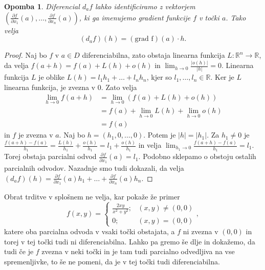 \documentclass[10pt, a4paper]{article}
\newtheorem*{opomba}{Opomba}
\newenvironment{noticeC}{%
  \tcolorbox[%
  notitle,
  empty,
  enhanced,  %
  breakable,
  coltext=black, 
  fontupper=\rmfamily,
  parbox=false,
  noparskip,
  sharp corners,
  boxrule=-1pt,  %
  frame hidden,
  left=7pt,  %
  right=7pt,
  top=5pt,
  bottom=5pt,
  before skip=2.5ex plus 2pt,
  after skip=2.5ex plus 2pt,
  overlay unbroken and last={%
  },
  ]}
{\endtcolorbox}
\newenvironment{dokaz}%
  {\begin{noticeC}\begin{proof}}%
  {\end{proof}\end{noticeC}}
\newcommand{\R}{\mathbb {R}}
\begin{document}
\begin{opomba}
    Diferencial $d_a f$ lahko identificiramo z vektorjem $(\frac{\partial f}{\partial x_1} (a), \dots, \frac{\partial f}{\partial x_n} (a))$,
    ki ga imenujemo gradient funkcije $f$ v točki $a$. Tako velja 
    $$(d_a f) (h) = (\mathrm{\text{grad \(f\)}}) (a) \cdot h.$$
\end{opomba}

\begin{dokaz}
    Naj bo $f$ v $a \in D$ diferenciabilna, zato obstaja linearna funkcija $L: \R^n \rightarrow \R$,
    da velja $f(a + h) = f(a) + L(h) + o(h)$ in $\lim_{h \to 0} \frac{|o (h)|}{|h|} = 0$.
    Linearna funkcija $L$ je oblike $L(h) = l_1 h_1 + \dots + l_n h_n$, 
    kjer so $l_1, \dots, l_n \in \R$. Ker je $L$ linearna funkcija, je zvezna v $0$.
    Zato velja 
    \begin{align*}
        \lim_{h \to 0} f(a + h) &= \lim_{h \to 0} (f(a) + L(h) + o(h))\\
        &= f(a) + \lim_{h \to 0} L(h) + \lim_{h \to 0} o(h)\\
        &= f(a) 
    \end{align*}
    in $f$ je zvezna v $a$. Naj bo $h = (h_1, 0, \dots, 0)$.
    Potem je $|h| = |h_1|$. Za $h_1 \neq 0$ je 
    $\frac{f(a + h) - f(a)}{h_1} = \frac{L(h)}{h_1} + \frac{o(h)}{h_1} = l_1 + \frac{o (h)}{h_1}$
    in velja $\lim_{h_1 \to 0} \frac{f(a + h) - f(a)}{h_1} = l_1$.
    Torej obstaja parcialni odvod $\frac{\partial f}{\partial x_1} (a) = l_1.$
    Podobno sklepamo o obstoju ostalih parcialnih odvodov.
    Nazadnje smo tudi dokazali, da velja $(d_a f) (h) = \frac{\partial f}{\partial x_1} (a) h_1 + \dots + \frac{\partial f}{\partial x_n} (a) h_n.$
\end{dokaz}

Obrat trditve v splošnem ne velja, kar pokaže že primer $$f(x, y) = \begin{cases}
    \frac{2xy}{x^2 + y^2} ;& (x, y) \neq (0,0)\\
    0; & (x, y) = (0,0)
\end{cases},$$
katere oba parcialna odvoda v vsaki točki obstajata, a $f$ ni zvezna v $(0,0)$ in 
torej v tej točki tudi ni diferenciabilna. Lahko pa gremo še dlje in dokažemo, da tudi če je $f$ zvezna 
v neki točki in je tam tudi parcialno odvedljiva na vse spremenljivke, to še ne pomeni,
da je v tej točki tudi diferenciabilna. 
\end{document}
